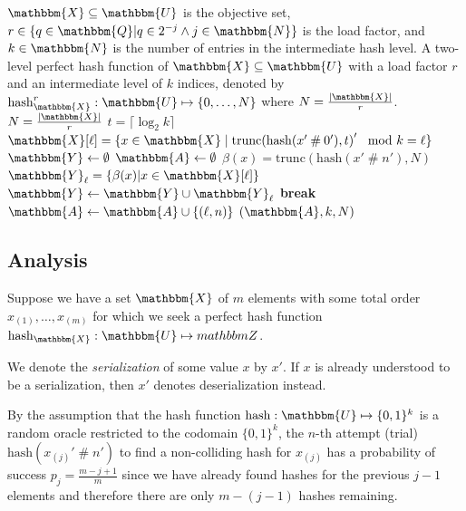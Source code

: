 \documentclass[hidelinks,11pt,final]{article}
\theoremstyle{plain}
\newcommand{\cat}{\mathbin{\#}}
\newcommand{\Break}{\textbf{break}}
\begin{document}
\begin{algorithm}
	\caption{Two-level perfect hash function constructor}
	\label{alg:2ph}
	\KwIn
	{
		$\mathbbm{X} \subseteq \mathbbm{U}$ is the objective set, $r \in \{q \in \mathbbm{Q} | q \in 2^{-j} \land j \in \mathbbm{N}\}$ is the load factor, and $k \in \mathbbm{N}$ is the number of entries in the intermediate hash level.
	}
	\KwOut
	{
		A two-level perfect hash function of $\mathbbm{X} \subseteq \mathbbm{U}$ with a load factor $r$ and an intermediate level of $k$ indices, denoted by $\mathrm{hash}_{\mathbbm{X}}^{r} : \mathbbm{U} \mapsto \left\{0,\ldots,N\right\}$ where $N = \frac{|\mathbbm{X}|}{r}$.
	}
	{
		$N = \frac{|\mathbbm{X}|}{r}$\;
		$t = \lceil \log_2 k \rceil$\;
		$\mathbbm{X}[\ell] = \{x \in \mathbbm{X} \mid \mathrm{trunc}\!\left(\mathrm{hash}(x' \cat 0'),t\right)' \mod k = \ell\}$\;
		$\mathbbm{Y} \gets \emptyset$\;
		$\mathbbm{A} \gets \emptyset$\;		
		{
			{
				$\beta(x) = \mathrm{trunc}\!\left(\mathrm{hash}(x' \cat n'),N\right)$\;
				$\mathbbm{Y}_\ell = \{\beta(x) | x \in \mathbbm{X}[\ell]\}$\;
				{
					$\mathbbm{Y} \gets \mathbbm{Y} \cup \mathbbm{Y}_\ell$\;
					\Break\;
				}
			}
			$\mathbbm{A} \gets \mathbbm{A} \cup \{(\ell,n)\}$\;
		}
		\Return $(\mathbbm{A},k,N)$
	}
\end{algorithm}

\subsection{Analysis}
Suppose we have a set $\mathbbm{X}$ of $m$ elements with some total order $x_{(1)},\ldots,x_{(m)}$ for which we seek a perfect hash function $\mathrm{hash}_{\mathbbm{X}} : \mathbbm{U} \mapsto mathbbm{Z}$.

We denote the \emph{serialization} of some value $x$ by $x'$.
If $x$ is already understood to be a serialization, then $x'$ denotes deserialization instead.

By the assumption that the hash function $\mathrm{hash} : \mathbbm{U} \mapsto \{0,1\}^k$ is a random oracle restricted to the codomain $\{0,1\}^k$, the $n$-th attempt (trial) $\mathrm{hash}\!\left(x_{(j)}' \cat n'\right)$ to find a non-colliding hash for $x_{(j)}$ has a probability of success $p_j = \frac{m-j+1}{m}$ since we have already found hashes for the previous $j-1$ elements and therefore there are only $m-(j-1)$ hashes remaining.
\end{document}
